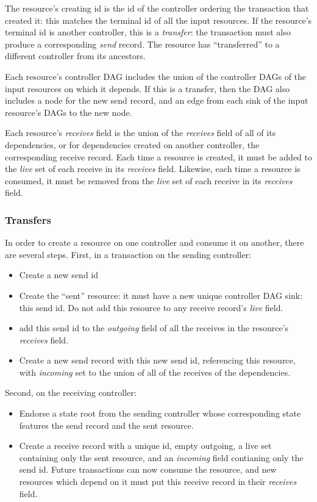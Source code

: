 \documentclass[a4paper,USenglish,cleveref, autoref, thm-restate, anonymous]{lipics-v2021}
\begin{document}
The resource's creating id is the id of the controller ordering the transaction that created it: this matches the terminal id of all the input resources.
If the resource's terminal id is another controller, this is a \emph{transfer}: the transaction must also produce a corresponding \emph{send} record. 
The resource has ``transferred'' to a different controller from its ancestors. 

Each resource's controller DAG includes the union of the controller DAGs of the input resources on which it depends.
If this is a transfer, then the DAG also includes a node for the new send record, and an edge from each sink of the input resource's DAGs to the new node.

Each resource's \emph{receives} field is the union of the \emph{receives} field of all of its dependencies, or for dependencies created on another controller, the corresponding receive record.
Each time a resource is created, it must be added to the \emph{live} set of each receive in its \emph{receives} field.
Likewise, each time a resource is consumed, it must be removed from the \emph{live} set of each receive in its \emph{receives} field. 

\subsubsection{Transfers}
In order to create a resource on one controller and consume it on another, there are several steps.
First, in a transaction on the sending controller:
\begin{itemize}
\item Create a new send id
\item Create the ``sent'' resource: it must have a new unique controller DAG sink: this send id. Do not add this resource to any receive record's \emph{live} field. 
\item add this send id to the \emph{outgoing} field of all the receives in the resource's \emph{receives} field.
\item Create a new send record with this new send id, referencing this resource, with \emph{incoming} set to the union of all of the receives of the dependencies. 
\end{itemize}
Second, on the receiving controller:
\begin{itemize}
  \item Endorse a state root from the sending controller whose corresponding state features the send record and the sent resource.
  \item Create a receive record  with a unique id, empty outgoing, a live set containing only the sent resource, and an \emph{incoming} field contianing only the send id.
        Future transactions can now consume the resource, and new resources which depend on it must put this receive record in their \emph{receives} field. 
\end{itemize}
\end{document}
